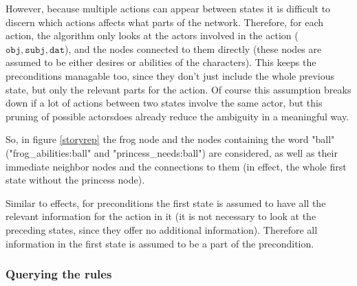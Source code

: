 However, because multiple actions can appear between states it is difficult to
discern which actions affects what parts of the network. 
Therefore, for each action, the algorithm only looks at the actors involved in 
the action ($\texttt{obj}, \texttt{subj}, \texttt{dat}$), and the nodes
connected to them directly (these nodes are assumed to be either desires or
abilities of the characters). This keeps the preconditions managable too, since
they don't just include the whole previous state, but only the relevant parts
for the action. Of course this assumption breaks down if a lot of actions
between two states
involve the same actor, but this pruning of possible actorsdoes already reduce
the ambiguity in a meaningful way.

So, in figure \ref{storyrep} the frog node and the nodes containing the word
"ball" ("frog\_abilities:ball" and "princess\_needs:ball") are considered, as
well as their immediate neighbor nodes and the connections to them (in effect,
the whole first state without the princess node).

Similar to effects, for preconditions the first state is assumed to have all the
relevant information for the action in it (it is not necessary to look at the 
preceding states, since they offer no additional information). Therefore all
information in the first state is assumed to be a part of the precondition.

\subsubsection{Querying the rules}

